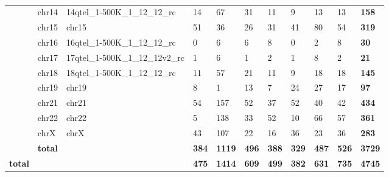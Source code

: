 \begin{samepage}
\begin{table}[h!]
\begin{tabular}{lllllllllll}
\textbf{}      & chr14               & 14qtel\_1-500K\_1\_12\_12\_rc   & 14             & 67             & 31             & 11             & 9              & 13             & 13             & \textbf{158}   \\
\textbf{}      & chr15               & chr15                           & 51             & 36             & 26             & 31             & 41             & 80             & 54             & \textbf{319}   \\
\textbf{}      & chr16               & 16qtel\_1-500K\_1\_12\_12\_rc   & 0              & 6              & 6              & 8              & 0              & 2              & 8              & \textbf{30}    \\
\textbf{}      & chr17               & 17qtel\_1-500K\_1\_12\_12v2\_rc & 1              & 6              & 1              & 2              & 1              & 8              & 2              & \textbf{21}    \\
\textbf{}      & chr18               & 18qtel\_1-500K\_1\_12\_12\_rc   & 11             & 57             & 21             & 11             & 9              & 18             & 18             & \textbf{145}   \\
\textbf{}      & chr19               & chr19                           & 8              & 1              & 13             & 7              & 24             & 27             & 17             & \textbf{97}    \\
\textbf{}      & chr21               & chr21                           & 54             & 157            & 52             & 37             & 52             & 40             & 42             & \textbf{434}   \\
\textbf{}      & chr22               & chr22                           & 5              & 138            & 33             & 52             & 10             & 66             & 57             & \textbf{361}   \\
\textbf{}      & chrX                & chrX                            & 43             & 107            & 22             & 16             & 36             & 23             & 36             & \textbf{283}   \\
\textbf{}      & \textbf{total}      & \textbf{}                       & \textbf{384}   & \textbf{1119}  & \textbf{496}   & \textbf{388}   & \textbf{329}   & \textbf{487}   & \textbf{526}   & \textbf{3729}  \\
\textbf{total} & \textbf{}           & \textbf{}                       & \textbf{475}   & \textbf{1414}  & \textbf{609}   & \textbf{499}   & \textbf{382}   & \textbf{631}   & \textbf{735}   & \textbf{4745}  \\
\hline
\end{tabular}
\caption{}
\label{}
\end{table}
\end{samepage}
